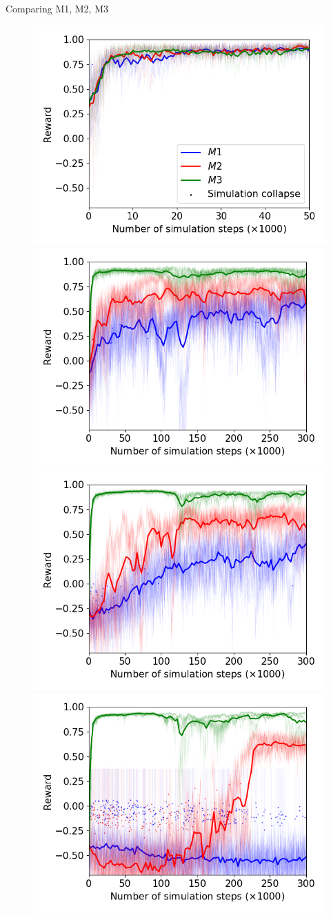 \documentclass{beamer}
\begin{document}
\begin{frame}{Comparing M1, M2, M3}
\begin{figure}
    \begin{center}
      \includegraphics[width=.43\textwidth]{Figures/figure_nice1jet_}
      \includegraphics[width=.43\textwidth]{Figures/figure_nice5jet_} \\
      \includegraphics[width=.43\textwidth]{Figures/figure_nice10jet_}
      \includegraphics[width=.43\textwidth]{Figures/figure_nice20jet_}
    \end{center}
    \end{figure}
\end{frame}
\end{document}

